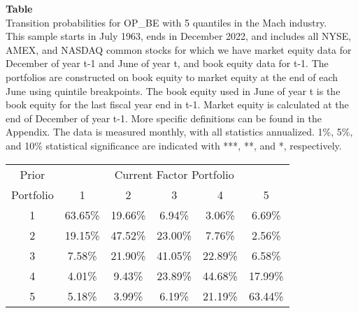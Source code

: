\begin{table*}[ht!]
\raggedright
{}
\label{tab: transition_probs_OP_BE_Mach_with_5_quantiles}
\textbf{Table \thetable} \\
Transition probabilities for OP_BE with 5 quantiles in the Mach industry. \\
\hspace*{1em}This sample starts in July 1963, ends in December 2022, and includes all NYSE, AMEX, and NASDAQ common stocks for which we have market equity data for December of year t-1 and June of year t, and book equity data for t-1. The portfolios are constructed on book equity to market equity at the end of each June using quintile breakpoints.  The book equity used in June of year t is the book equity for the last fiscal year end in t-1.  Market equity is calculated at the end of December of year t-1.  More specific definitions can be found in the Appendix.  The data is measured monthly, with all statistics annualized.  1\%, 5\%, and 10\% statistical significance are indicated with ***, **, and *, respectively. \\
\vspace{0.5em}
\centering
\begin{adjustbox}{max width=\textwidth}
\begin{tabular}{@{}cccccc@{}}
\toprule
Prior & \multicolumn{5}{c}{Current Factor Portfolio} \\
Portfolio & 1 & 2 & 3 & 4 & 5 \\
\midrule
1 & 63.65\% & 19.66\% & 6.94\% & 3.06\% & 6.69\% \\
2 & 19.15\% & 47.52\% & 23.00\% & 7.76\% & 2.56\% \\
3 & 7.58\% & 21.90\% & 41.05\% & 22.89\% & 6.58\% \\
4 & 4.01\% & 9.43\% & 23.89\% & 44.68\% & 17.99\% \\
5 & 5.18\% & 3.99\% & 6.19\% & 21.19\% & 63.44\% \\
\bottomrule
\end{tabular}
\end{adjustbox}
\end{table*}